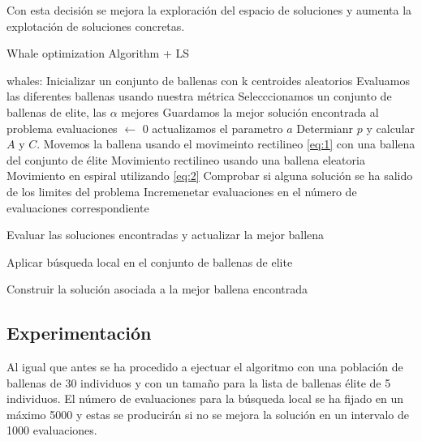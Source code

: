 \documentclass[11pt]{article}
\begin{document}
Con esta decisión se mejora la exploración del espacio de soluciones y aumenta
la explotación de soluciones concretas.

\begin{algorithm}[H]
  \caption{Whale optimization Algorithm + LS}
  \label{alg-lsearch}
  \begin{algorithmic}[1]
    \State whales: Inicializar un conjunto de ballenas con k centroides aleatorios
    \State Evaluamos las diferentes ballenas usando nuestra métrica 
    \State Selecccionamos un conjunto de ballenas de elite, las $\alpha$ mejores
    \State Guardamos la mejor solución encontrada al problema
    \State evaluaciones $\leftarrow$ 0
    \State actualizamos el parametro $a$
    \State Determianr $p$ y calcular  $A$ y $C$.
    \State Movemos la ballena usando el movimeinto rectilineo \eqref{eq:1} con una ballena del conjunto de élite
    \State Movimiento rectilineo usando una ballena eleatoria
    \EndIf
    \Else
    \State Movimiento en espiral utilizando \eqref{eq:2}
    \EndIf
    \EndFor 
    \State Comprobar si alguna solución se ha salido de los limites del problema
    \State Incremenetar evaluaciones en el número de evaluaciones correspondiente
    
    \State Evaluar las soluciones encontradas y actualizar la mejor ballena 

    \State Aplicar búsqueda local en el conjunto de ballenas de elite
    \EndIf

    \EndWhile
    \State
    \Return Construir la solución asociada a la mejor ballena encontrada
    \EndProcedure
  \end{algorithmic}
\end{algorithm}

\subsection{Experimentación}

Al igual que antes se ha procedido a ejectuar el algoritmo con una población de
ballenas  de 30 individuos y con un tamaño para la lista de ballenas élite de 5
individuos. El número de evaluaciones para la búsqueda local se ha fijado en un
máximo 5000 y estas se producirán si no se mejora la solución en un intervalo de
1000 evaluaciones.
\end{document}
